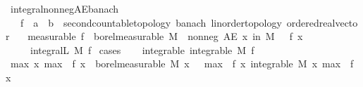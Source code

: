 \begin{isabellebody}
\isamarkupfalse%
%
\endisatagproof
{\isafoldproof}%
%
\isadelimproof
\isanewline
%
\endisadelimproof
\isanewline
{}\isamarkupfalse%
\ integral{\isacharunderscore}{\kern0pt}nonneg{\isacharunderscore}{\kern0pt}AE{\isacharunderscore}{\kern0pt}banach{\isacharcolon}{\kern0pt}\ \ \ \ \ \ \ \ \ \ \ \ \ \ \ \ \ \ \ \ \ \ \ \ \isanewline
\ \ \ f\ {\isacharcolon}{\kern0pt}{\isacharcolon}{\kern0pt}\ {\isachardoublequoteopen}{\isacharprime}{\kern0pt}a\ {\isasymRightarrow}\ {\isacharprime}{\kern0pt}b\ {\isacharcolon}{\kern0pt}{\isacharcolon}{\kern0pt}\ {\isacharbraceleft}{\kern0pt}second{\isacharunderscore}{\kern0pt}countable{\isacharunderscore}{\kern0pt}topology{\isacharcomma}{\kern0pt}\ banach{\isacharcomma}{\kern0pt}\ linorder{\isacharunderscore}{\kern0pt}topology{\isacharcomma}{\kern0pt}\ ordered{\isacharunderscore}{\kern0pt}real{\isacharunderscore}{\kern0pt}vector{\isacharbraceright}{\kern0pt}{\isachardoublequoteclose}\isanewline
\ \ \ {\isacharbrackleft}{\kern0pt}measurable{\isacharbrackright}{\kern0pt}{\isacharcolon}{\kern0pt}\ {\isachardoublequoteopen}f\ {\isasymin}\ borel{\isacharunderscore}{\kern0pt}measurable\ M{\isachardoublequoteclose}\ \ nonneg{\isacharcolon}{\kern0pt}\ {\isachardoublequoteopen}AE\ x\ in\ M{\isachardot}{\kern0pt}\ {}\ {\isasymle}\ f\ x{\isachardoublequoteclose}\isanewline
\ \ \ {\isachardoublequoteopen}{}\ {\isasymle}\ integral\isactrlsup L\ M\ f{\isachardoublequoteclose}\isanewline
%
\isadelimproof
%
\endisadelimproof
%
\isatagproof
{}\isamarkupfalse%
\ cases\isanewline
\ \ \isamarkupfalse%
\ integrable{\isacharcolon}{\kern0pt}\ {\isachardoublequoteopen}integrable\ M\ f{\isachardoublequoteclose}\isanewline
\ \ \isamarkupfalse%
\ max{\isacharcolon}{\kern0pt}\ {\isachardoublequoteopen}{\isacharparenleft}{\kern0pt}{\isasymlambda}x{\isachardot}{\kern0pt}\ max\ {}\ {\isacharparenleft}{\kern0pt}f\ x{\isacharparenright}{\kern0pt}{\isacharparenright}{\kern0pt}\ {\isasymin}\ borel{\isacharunderscore}{\kern0pt}measurable\ M{\isachardoublequoteclose}\ {\isachardoublequoteopen}{\isasymAnd}x{\isachardot}{\kern0pt}\ {}\ {\isasymle}\ max\ {}\ {\isacharparenleft}{\kern0pt}f\ x{\isacharparenright}{\kern0pt}{\isachardoublequoteclose}\ {\isachardoublequoteopen}integrable\ M\ {\isacharparenleft}{\kern0pt}{\isasymlambda}x{\isachardot}{\kern0pt}\ max\ {}\ {\isacharparenleft}{\kern0pt}f\ x{\isacharparenright}{\kern0pt}{\isacharparenright}{\kern0pt}{\isachardoublequoteclose}\ \isamarkupfalse%

\end{isabellebody}
